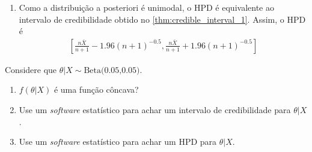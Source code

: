 {\begin{enumerate}[label=(\alph*)]
\begin{itemize}
   \item Usando o \cref{thm:credible_interval_3}, 
   obtemos um intervalo $[a,b]$ da forma
   \begin{align*}
    [a,b]
    &= \left[\E[\theta|X]-c\sqrt{\V[\theta|X]},
    \E[\theta|X]+c\sqrt{\V[\theta|X]}\right]
   \end{align*}
   Sabemos pelos itens anteriores que este 
   intervalo tem credibilidade $95\%$ somente se 
   $c=1.96$. Assim, obtemos o intervalo
   \begin{align*}
    \left[\frac{n\bar{X}}{n+1}-1.96(n+1)^{-0.5},
    \frac{n\bar{X}}{n+1}+1.96(n+1)^{-0.5}\right]
   \end{align*}
  \end{itemize}
  
  No caso da distribuição normal,
  que é unimodal e simétrica em torno de sua média,
  todos os intervalos de credibilidade são equivalentes.
	
  \item Como a distribuição a posteriori é unimodal,
  o HPD é equivalente ao intervalo de credibilidade 
  obtido no \cref{thm:credible_interval_1}.
  Assim, o HPD é
  \begin{align*}
   \left[\frac{n\bar{X}}{n+1}-1.96(n+1)^{-0.5},
   \frac{n\bar{X}}{n+1}+1.96(n+1)^{-0.5}\right]
  \end{align*}
 \end{enumerate}
}{}

\begin{exercise}
 Considere que $\theta|X \sim \text{Beta(0.05,0.05)}$.
 \begin{enumerate}[label=(\alph*)]
  \item $f(\theta|X)$ é uma função côncava?
  \item Use um \emph{software} estatístico para 
  achar um intervalo de credibilidade para $\theta|X$.
  \item Use um \emph{software} estatístico para 
  achar um HPD para $\theta|X$.
 \end{enumerate}
\end{exercise}

